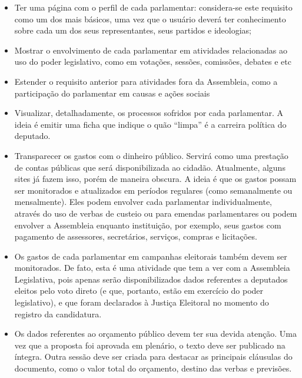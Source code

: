 \documentclass[12pt, a4paper]{article}
\begin{document}
    \begin{itemize}
        \item
        Ter uma página com o perfil de cada parlamentar: considera-se este
        requisito como um dos mais básicos, uma vez que o usuário deverá ter
        conhecimento sobre cada um dos seus representantes, seus partidos e
        ideologias;
        \item
        Mostrar o envolvimento de cada parlamentar em atividades relacionadas
        ao uso do poder legislativo, como em votações, sessões, comissões,
        debates e etc
        \item
        Estender o requisito anterior para atividades fora da Assembleia, como
        a participação do parlamentar em causas e ações sociais
        \item
        Visualizar, detalhadamente, os processos sofridos por cada parlamentar.
        A ideia é emitir uma ficha que indique o quão “limpa” é a carreira
        política do deputado.
        \item
        Transparecer os gastos com o dinheiro público. Servirá como uma
        prestação de contas públicas que será disponibilizada ao cidadão.
        Atualmente, alguns sites já fazem isso, porém de maneira obscura. A
        ideia é que os gastos possam ser monitorados e atualizados em períodos
        regulares (como semanalmente ou mensalmente). Eles podem envolver cada
        parlamentar individualmente, através do uso de verbas de custeio ou
        para emendas parlamentares ou podem envolver a Assembleia enquanto
        instituição, por exemplo, seus gastos com pagamento de assessores,
        secretários, serviços, compras e licitações.
        \item
        Os gastos de cada parlamentar em campanhas eleitorais também devem ser
        monitorados. De fato, esta é uma atividade que tem a ver com a
        Assembleia Legislativa, pois apenas serão disponibilizados dados
        referentes a deputados eleitos pelo voto direto (e que, portanto, estão
        em exercício do poder legislativo), e que foram declarados à Justiça
        Eleitoral no momento do registro da candidatura.
        \item
        Os dados referentes ao orçamento público devem ter sua devida atenção.
        Uma vez que a proposta foi aprovada em plenário, o texto deve ser
        publicado na íntegra. Outra sessão deve ser criada para destacar as
        principais cláusulas do documento, como o valor total do orçamento,
        destino das verbas e previsões.

\end{itemize}
\end{document}

